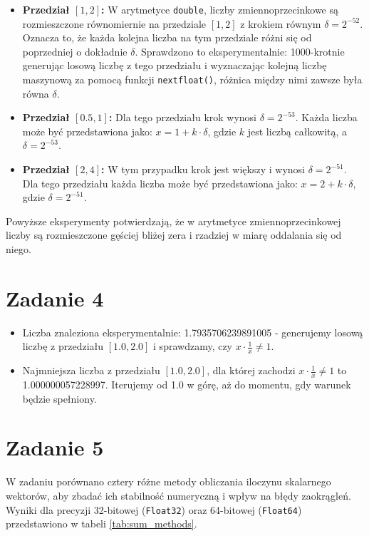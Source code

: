 \documentclass{article}
\begin{document}
\begin{itemize}
    \item \textbf{Przedział \([1, 2]\):} W arytmetyce \texttt{double}, liczby zmiennoprzecinkowe są rozmieszczone równomiernie na przedziale \([1, 2]\) z krokiem równym $\delta = 2^{-52}$. Oznacza to, że każda kolejna liczba na tym przedziale różni się od poprzedniej o dokładnie $\delta$. Sprawdzono to eksperymentalnie: 1000-krotnie generując losową liczbę z tego przedziału i wyznaczając kolejną liczbę maszynową za pomocą funkcji \texttt{nextfloat()}, różnica między nimi zawsze była równa $\delta$.

    \item \textbf{Przedział \([0.5, 1]\):} Dla tego przedziału krok wynosi $\delta = 2^{-53}$. Każda liczba może być przedstawiona jako: $x = 1 + k \cdot \delta$, gdzie $k$ jest liczbą całkowitą, a $\delta = 2^{-53}$.

    \item \textbf{Przedział \([2, 4]\):} W tym przypadku krok jest większy i wynosi $\delta = 2^{-51}$. Dla tego przedziału każda liczba może być przedstawiona jako: $x = 2 + k \cdot \delta$, gdzie $\delta = 2^{-51}$.
\end{itemize}

Powyższe eksperymenty potwierdzają, że w arytmetyce zmiennoprzecinkowej liczby są rozmieszczone gęściej bliżej zera i rzadziej w miarę oddalania się od niego.

\newpage
\section*{Zadanie 4}
\begin{itemize}
    \item Liczba znaleziona eksperymentalnie: 1.7935706239891005 - generujemy losową liczbę z przedziału \([1.0, 2.0]\) i sprawdzamy, czy $ x \cdot \frac{1}{x} \neq 1$. 
    \item Najmniejsza liczba z przedziału \([1.0, 2.0]\), dla której zachodzi \(x \cdot \frac{1}{x} \neq 1\) to 1.000000057228997. Iterujemy od 1.0 w górę, aż do momentu, gdy warunek będzie spełniony.
\end{itemize}

\section*{Zadanie 5}

W zadaniu porównano cztery różne metody obliczania iloczynu skalarnego wektorów, aby zbadać ich stabilność numeryczną i wpływ na błędy zaokrągleń. Wyniki dla precyzji 32-bitowej (\texttt{Float32}) oraz 64-bitowej (\texttt{Float64}) przedstawiono w tabeli \ref{tab:sum_methods}.
\end{document}
